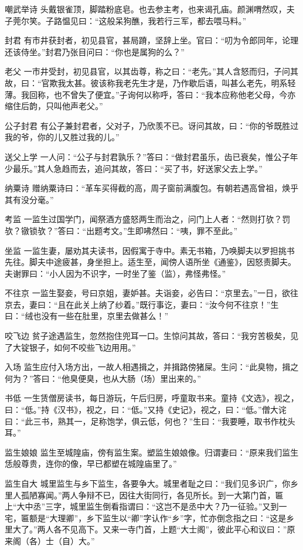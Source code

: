 \documentclass[12pt,UTF8]{ctexbook}
\begin{document}
嘲武举诗
头戴银雀顶，脚踏粉底皂。也去参主考，也来谒孔庙。颜渊喟然叹，夫子莞尔笑。子路愠见曰：“这般呆狗醮，我若行三军，都去喂马料。”

封君
有市井获封者，初见县官，甚局蹐，坚辞上坐。官曰：“叨为令郎同年，论理还该侍坐。”封君乃张目问曰：“你也是属狗的么？”

老父
一市井受封，初见县官，以其齿尊，称之曰：“老先。”其人含怒而归，子问其故，曰：“官欺我太甚。彼该称我老先生才是，乃作歇后语，叫甚么老先，明系轻薄。我回称，也不曾失了便宜。”子询何以称呼，答曰：“我本应称他老父母，今亦缩住后韵，只叫他声老父。”

公子封君
有公子兼封君者，父对子，乃欣羡不已。讶问其故，曰：“你的爷既胜过我的爷，你的儿又胜过我的儿。”

送父上学
一人问：“公子与封君孰乐？”答曰：“做封君虽乐，齿已衰矣，惟公子年少最乐。”其人急趋而去，追问其故，答曰：“买了书，好送家父去上学。”

纳粟诗
赠纳粟诗曰：“革车买得截的高，周子窗前满腹包。有朝若遇高曾祖，焕乎其有没分毫。”

考监
一监生过国学门，闻祭酒方盛怒两生而治之，问门上人者：“然则打欤？罚欤？镦锁欤？”答曰：“出题考文。”生即咈然曰：“咦，罪不至此。”

坐监
一监生妻，屡劝其夫读书，因假寓于寺中。素无书箱，乃唤脚夫以罗担挑书先往。脚夫中途疲甚，身坐担上。适生至，闻傍人语所坐《通鉴》，因怒责脚夫。夫谢罪曰：“小人因为不识字，一时坐了鉴（监），弗怪弗怪。”

不往京
一监生娶妾，号曰京姐，妻妒甚。夫诣妾，必告曰：“京里去。”一日，欲往京去，妻曰：“且在此关上纳了纱着。”既行事讫，妻曰：“汝今何不往京！”生曰：“绒也没有一些在肚里，京里去做甚么！”

咬飞边
贫子途遇监生，忽然抱住兜耳一口。生惊问其故，答曰：“我穷苦极矣，见了大锭银子，如何不咬些飞边用用。”

入场
监生应付入场方出，一故人相遇揖之，并揖路傍猪屎。生问：“此臭物，揖之何为？”答曰：“他臭便臭，也从大肠（场）里出来的。”

书低
一生赁僧房读书，每日游玩，午后归房，呼童取书来。童持《文选》，视之，曰：“低。”持《汉书》，视之，曰：“低。”又持《史记》，视之，曰：“低。”僧大诧曰：“此三书，熟其一，足称饱学，俱云低，何也？”生曰：“我要睡，取书作枕头耳。”

监生娘娘
监生至城隍庙，傍有监生案。塑监生娘娘像。归谓妻曰：“原来我们监生恁般尊贵，连你的像，早已都塑在城隍庙里了。”

监生自大
城里监生与乡下监生，各要争大。城里者耻之曰：“我们见多识广，你乡里人孤陋寡闻。”两人争辩不已，因往大街同行，各见所长。到一大第门首，匾上“大中丞”三字，城里监生倒看指谓曰：“这岂不是丞中大？乃一征验。”又到一宅，匾额是“大理卿”，乡下监生以“卿”字认作“乡”字，忙亦倒念指之曰：“这是乡里大了。”两人各不见高下。又来一寺门首，上题“大士阁”，彼此平心和议曰：”原来阁（各）士（自）大。”
\end{document}

